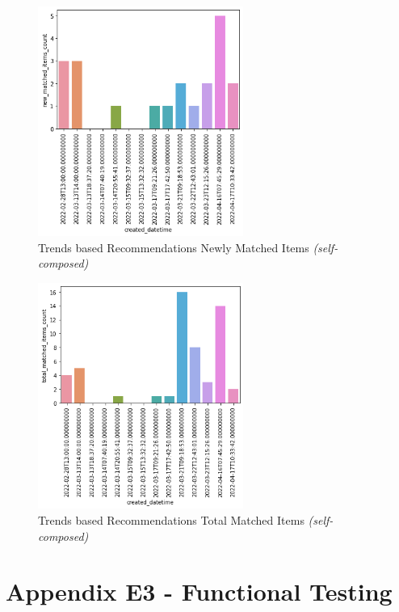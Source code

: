 \begin{figure}[h!]
\centering
\includegraphics[width=0.6\textwidth]{images/Testing/trends/new_matched_items_per_day.png}
\caption{Trends based Recommendations Newly Matched Items \textit{(self-composed)}}
\label{fig:trends-recsys-trends-new-matches}
\end{figure}

\begin{figure}[h!]
\centering
\includegraphics[width=0.6\textwidth]{images/Testing/trends/total_matched_items_per_day.png}
\caption{Trends based Recommendations Total Matched Items \textit{(self-composed)}}
\label{fig:trends-recsys-trends-total-matches}
\end{figure}

\clearpage
\section*{Appendix E3 - Functional Testing}

